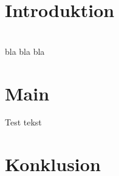 \documentclass[svgnames,two side,openright,a4paper]{book}
\newcommand{\fncyfront}{%
	\fancyhead [RO] {{\footnotesize \rightmark}}
	\fancyfoot [RO] {\thepage}
	\fancyhead [LE] {{\footnotesize \leftmark}}
	\fancyfoot [LE] {\thepage}
	\fancyhead [RE,LO] {}
	\fancyfoot [C] {}
	\renewcommand{\headrulewidth}{0.3pt}}
\begin{document}
	\fncyfront
	\frontmatter
	
	
	\tableofcontents

\mainmatter

\chapter{Introduktion}
\\

bla bla bla \citep{Jacobsen:2008M,Johannsen:2009M,Gympd,Michelsen:2011M,Dolin:2007M,Harlen:2011:M}
\chapter{Main}
Test tekst\citep{Gympd}

\chapter{Konklusion}

\backmatter

\end{document}
